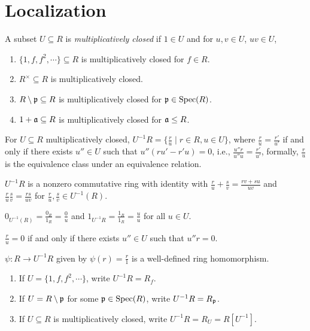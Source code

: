 \chapter{Localization}

\begin{recall}
    A subset $U \subseteq R$ is \emph{multiplicatively closed} if $1 \in U$ and for $u,v \in U$, $uv \in U$, 
\end{recall}

\begin{example}
    \begin{enumerate}
        \item $\{1,f,f^2,\cdots\} \subseteq R$ is multiplicatively closed for $f \in R$.
        \item $R^\times \subseteq R$ is multiplicatively closed.
        \item $R \setminus \mathfrak{p} \subseteq R$ is multiplicatively closed for $\mathfrak{p} \in \operatorname{Spec}(R)$.
        \item $1 + \mathfrak{a} \subseteq R$ is multiplicatively closed for $\mathfrak{a} \leq R$.
    \end{enumerate}
\end{example}

\begin{recall} \label{defOfMultiplicativelyClosedSet}
    For $U \subseteq R$ multiplicatively closed, $U^{-1}R = \{\frac{r}{u} \mid r \in R, u \in U\}$, where $\frac{r}{u} = \frac{r'}{u'}$ if and only if there exists $u'' \in U$ such that $u''(ru'-r'u) = 0$, i.e., $\frac{u''r}{u''u} = \frac{r'}{u'}$, formally, $\frac{r}{u}$ is the equivalence class under an equivalence relation. \par 
    $U^{-1}R$ is a nonzero commutative ring with identity with $\frac{r}{u} + \frac{s}{v} = \frac{rv+su}{uv}$ and $\frac{r}{u} \frac{s}{v} = \frac{rs}{uv}$ for $\frac{r}{u},\frac{s}{v} \in U^{-1}(R)$. \par 
    $0_{U^{-1}(R)} = \frac{0_R}{1_R} = \frac{0}{u}$ and $1_{U^{-1}R} = \frac{1_{R}}{1_{R}} = \frac{u}{u}$ for all $u \in U$. \par 
    $\frac{r}{u} = 0$ if and only if there exists $u'' \in U$ such that $u''r = 0$. \par 
    $\psi: R \to U^{-1}R$ given by $\psi(r) = \frac{r}{1}$ is a well-defined ring homomorphism.
\end{recall}

\begin{notation}
    \begin{enumerate}
        \item If $U = \{1,f,f^2,\cdots\}$, write $U^{-1}R = R_f$.
        \item If $U = R \setminus \mathfrak{p}$ for some $\mathfrak{p} \in \operatorname{Spec}(R)$, write $U^{-1}R = R_{\mathfrak{p}}$.
        \item If $U \subseteq R$ is multiplicatively closed, write $U^{-1}R = R_U = R[U^{-1}]$.
    \end{enumerate}
\end{notation}

